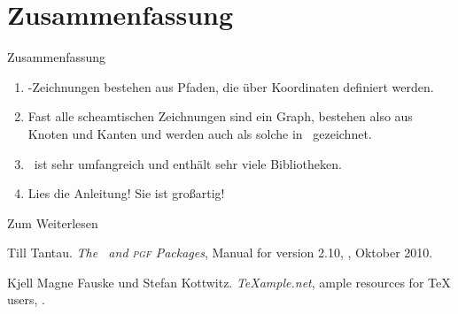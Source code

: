 \section*{Zusammenfassung}

\begin{frame}{Zusammenfassung}
  \begin{enumerate}
    \item \TikZ-Zeichnungen bestehen aus \alert{Pfaden}, die über \alert{Koordinaten} definiert werden.
    \item Fast alle scheamtischen Zeichnungen sind ein \alert{Graph}, bestehen also aus \alert{Knoten} und \alert{Kanten} und
      werden auch als solche in \TikZ\ gezeichnet.
    \item \TikZ\ ist sehr umfangreich und enthält \alert{sehr viele Bibliotheken}.
    \item \alert{Lies die Anleitung! Sie ist großartig!}
  \end{enumerate}
\end{frame}

\begin{Frame}{Zum Weiterlesen}
  \begin{mybib}
      Till Tantau.
      \newblock \emph{The \TikZ\ and \textsc{pgf} Packages},
      \newblock Manual for version 2.10,
      \newblock {}, Oktober 2010.

      Kjell Magne Fauske und Stefan Kottwitz.
      \newblock \emph{\TeX ample.net},
      \newblock ample resources for TeX users,
      \newblock {}.
  \end{mybib}
\end{Frame}